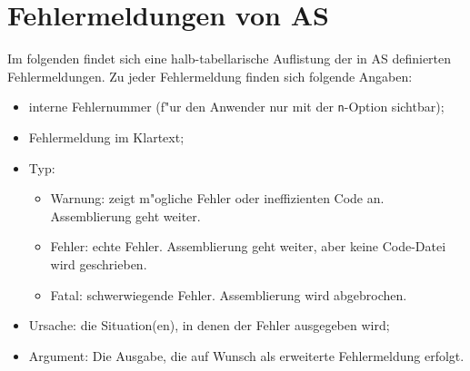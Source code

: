 \documentclass[12pt,a4paper,twoside]{report}
\newcommand{\tty}[1]{{\tt #1}}
\begin{document}
\cleardoublepage
\chapter{Fehlermeldungen von AS}
\label{ChapErrMess}

Im folgenden findet sich eine halb-tabellarische Auflistung der in AS
definierten Fehlermeldungen.  Zu jeder Fehlermeldung finden sich folgende
Angaben:
\begin{itemize}
\item{interne Fehlernummer (f"ur den Anwender nur mit der \tty{n}-Option sichtbar);}
\item{Fehlermeldung im Klartext;}
\item{Typ:
      \begin{itemize}
      \item{Warnung: zeigt m"ogliche Fehler oder ineffizienten Code an.
            Assemblierung geht weiter.}
      \item{Fehler: echte Fehler.  Assemblierung geht weiter, aber keine
            Code-Datei wird geschrieben.}
      \item{Fatal: schwerwiegende Fehler.  Assemblierung wird abgebrochen.}
      \end{itemize}}
\item{Ursache: die Situation(en), in denen der Fehler ausgegeben
      wird;}
\item{Argument: Die Ausgabe, die auf Wunsch als erweiterte Fehlermeldung
      erfolgt.}
\end{itemize}

\par

\newcommand{\errentry}[5]
           {\item[#1]{#2
                      \begin{description}
                      \item[Type:]{\ \\#3}
                      \item[Reason:]{\ \\#4}
                      \item[Argument:]{\ \\#5}
                      \end{description}}
           }
\end{document}
